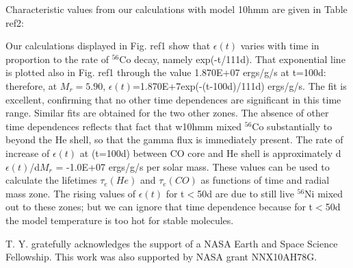\documentclass[manuscript]{aastex}
\begin{document}
Characteristic values from our calculations with model 10hmm are given in 
Table ref2:

Our calculations displayed in Fig. ref1 show that $\epsilon(t)$ varies with 
time in proportion to the rate of $^{56}$Co decay, namely exp(-t/111d). 
That exponential line is plotted also in Fig. ref1 through the value 
1.870E+07 ergs/g/s at t=100d:  therefore, at $M_r=5.90$, 
$\epsilon(t)$=1.870E+7exp(-(t-100d)/111d) ergs/g/s. The fit is excellent, 
confirming that no other time dependences are significant in this time range. 
Similar fits are obtained for the two other zones. The absence of 
other time dependences reflects that fact that w10hmm mixed $^{56}$Co 
substantially to beyond the He shell, so that the gamma flux is 
immediately present. The rate of increase of $\epsilon(t)$ at (t=100d) 
between CO 
core and He shell is approximately d$\epsilon(t)$/d$M_r$ = -1.0E+07 ergs/g/s 
per solar mass. These values can be used to calculate the lifetimes 
$\tau_e(He)$ 
and $\tau_e(CO)$ as functions of time and radial mass zone. The rising values 
of $\epsilon(t)$ for t$<$50d are due to still live $^{56}$Ni mixed out to 
these zones; but we can ignore that time dependence because for t$<$50d the 
model temperature is too hot for stable molecules. 

\acknowledgments

T. Y. gratefully acknowledges the support of
a NASA Earth and Space Science Fellowship.
This work was also supported by NASA grant NNX10AH78G.
\end{document}
